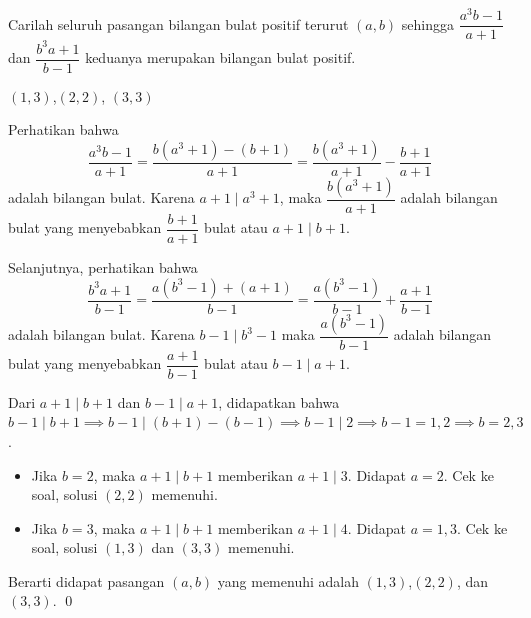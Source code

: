 \documentclass[12pt]{scrartcl}
\begin{document}
	\newpage
	\begin{soalbaru} 
		Carilah seluruh pasangan bilangan bulat positif terurut $(a,b)$ sehingga $\dfrac{a^3b-1}{a+1}$ dan $\dfrac{b^3a+1}{b-1}$ keduanya merupakan bilangan bulat positif.
		\begin{jawaban}
		$(1,3)$,$(2,2)$, $(3,3)$
		\end{jawaban}
		\begin{solusi}
			Perhatikan bahwa $$\dfrac{a^3b-1}{a+1}=\dfrac{b(a^3+1)-(b+1)}{a+1} =\dfrac{b(a^3+1)}{a+1}-\dfrac{b+1}{a+1}$$ adalah bilangan bulat. Karena $a+1 \mid a^3+1$, maka $\dfrac{b(a^3+1)}{a+1}$ adalah bilangan bulat yang menyebabkan $\dfrac{b+1}{a+1}$ bulat atau $a+1 \mid b+1$.
			
			Selanjutnya, perhatikan bahwa $$\dfrac{b^3a+1}{b-1}=\dfrac{a(b^3-1)+(a+1)}{b-1}=\dfrac{a(b^3-1)}{b-1}+\dfrac{a+1}{b-1}$$ adalah bilangan bulat. Karena $b-1 \mid b^3-1$ maka $\dfrac{a(b^3-1)}{b-1}$ adalah bilangan bulat yang menyebabkan $\dfrac{a+1}{b-1}$ bulat atau $b-1 \mid a+1$. 
			
			Dari $a+1 \mid b+1$ dan $b-1 \mid a+1$, didapatkan bahwa $b-1 \mid b+1 \implies b-1 \mid (b+1)-(b-1) \implies b-1 \mid 2 \implies b-1=1,2 \implies b=2,3$.
			
			\begin{itemize}
			\item Jika $b=2$, maka $a+1\mid b+1$ memberikan $a+1\mid 3$. Didapat $a=2$. Cek ke soal, solusi $(2,2)$ memenuhi.
						
			\item Jika $b=3$, maka $a+1 \mid b+1$ memberikan $a+1\mid 4$. Didapat $a=1,3$. Cek ke soal, solusi $(1,3)$ dan $(3,3)$ memenuhi.
			\end{itemize}
			
			Berarti didapat pasangan $(a,b)$ yang memenuhi adalah $(1,3)$,$(2,2)$, dan $(3,3)$. \qed 
		\end{solusi}
	\end{soalbaru}
	\newpage
	
\end{document}
